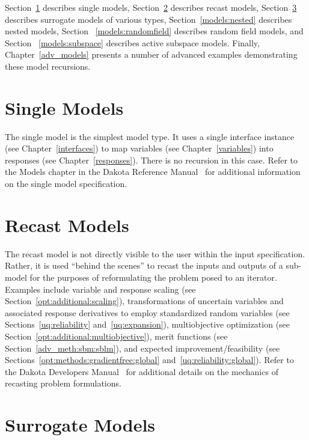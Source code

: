 Section~\ref{models:single} describes single models,
Section~\ref{models:recast} describes recast models,
Section~\ref{models:surrogate} describes surrogate models of various
types, Section~\ref{models:nested} describes nested models, Section
~\ref{models:randomfield} describes random field models, and Section
~\ref{models:subspace} describes active subspace models.  Finally,
Chapter~\ref{adv_models} presents a number of advanced examples
demonstrating these model recursions.

\section{Single Models}\label{models:single}

The single model is the simplest model type.  It uses a single
interface instance (see Chapter~\ref{interfaces}) to map variables
(see Chapter~\ref{variables}) into responses (see
Chapter~\ref{responses}).  There is no recursion in this case.  Refer
to the Models chapter in the Dakota Reference Manual~\cite{RefMan} for
additional information on the single model specification.

\section{Recast Models}\label{models:recast}

The recast model is not directly visible to the user within the input
specification.  Rather, it is used ``behind the scenes'' to recast the
inputs and outputs of a sub-model for the purposes of reformulating
the problem posed to an iterator.  Examples include variable and
response scaling (see Section~\ref{opt:additional:scaling}),
transformations of uncertain variables and associated response
derivatives to employ standardized random variables (see
Sections~\ref{uq:reliability} and~\ref{uq:expansion}), multiobjective
optimization (see Section~\ref{opt:additional:multiobjective}), merit
functions (see Section~\ref{adv_meth:sbm:sblm}), and expected
improvement/feasibility (see Sections~\ref{opt:methods:gradientfree:global}
and~\ref{uq:reliability:global}).  Refer to the Dakota Developers
Manual~\cite{DevMan} for additional details on the mechanics of
recasting problem formulations.

\section{Surrogate Models}\label{models:surrogate}

